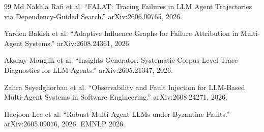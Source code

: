 \begin{thebibliography}{99}
Md Nakhla Rafi et al.
``FALAT: Tracing Failures in LLM Agent Trajectories via Dependency-Guided Search.''
arXiv:2606.00765, 2026.

Yarden Bakish et al.
``Adaptive Influence Graphs for Failure Attribution in Multi-Agent Systems.''
arXiv:2608.24361, 2026.

Akshay Manglik et al.
``Insights Generator: Systematic Corpus-Level Trace Diagnostics for LLM Agents.''
arXiv:2605.21347, 2026.

Zahra Seyedghorban et al.
``Observability and Fault Injection for LLM-Based Multi-Agent Systems in Software Engineering.''
arXiv:2608.24271, 2026.

Haejoon Lee et al.
``Robust Multi-Agent LLMs under Byzantine Faults.''
arXiv:2605.09076, 2026. EMNLP 2026.
\end{thebibliography}




